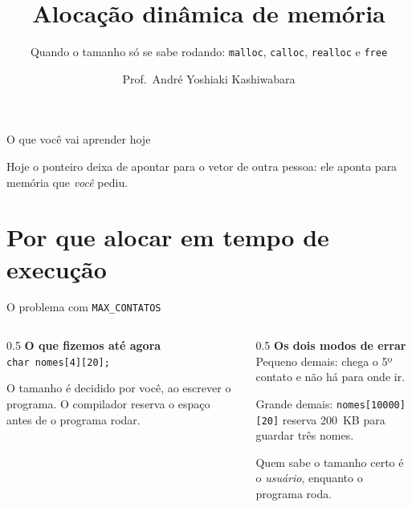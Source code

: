 \documentclass[aspectratio=169]{beamer}
\title{Alocação dinâmica de memória}
\subtitle{Quando o tamanho só se sabe rodando: \texttt{malloc}, \texttt{calloc}, \texttt{realloc} e \texttt{free}}
\author{Prof.\ André Yoshiaki Kashiwabara}
\institute{DCOMP -- Universidade Federal de Sergipe\\
\texttt{andreyoshiaki@dcomp.ufs.br}}
\date{}
\begin{document}
\begin{frame}[plain]
  \titlepage
\end{frame}

\begin{frame}{O que você vai aprender hoje}
  \begin{center}
  \end{center}
  \begin{center}
  \small Hoje o ponteiro deixa de apontar para o vetor de outra pessoa:
  ele aponta para memória que \emph{você} pediu.
  \end{center}
\end{frame}

\section{Por que alocar em tempo de execução}

\begin{frame}{O problema com \texttt{MAX\_CONTATOS}}
  \begin{columns}[T]
    \begin{column}{0.5\textwidth}
      \textbf{O que fizemos até agora}\\[0.3em]
      \texttt{char nomes[4][20];}

      \medskip
      O tamanho é decidido por você, ao escrever o programa. O compilador
      reserva o espaço antes de o programa rodar.
    \end{column}
    \begin{column}{0.5\textwidth}
      \textbf{Os dois modos de errar}\\[0.3em]
      \textcolor{UFSRed}{Pequeno demais:} chega o 5º contato e não há para
      onde ir.

      \medskip
      \textcolor{UFSRed}{Grande demais:} \texttt{nomes[10000][20]} reserva
      200~KB para guardar três nomes.

      \medskip
      Quem sabe o tamanho certo é o \emph{usuário}, enquanto o programa roda.
    \end{column}
  \end{columns}
\end{frame}
\end{document}
